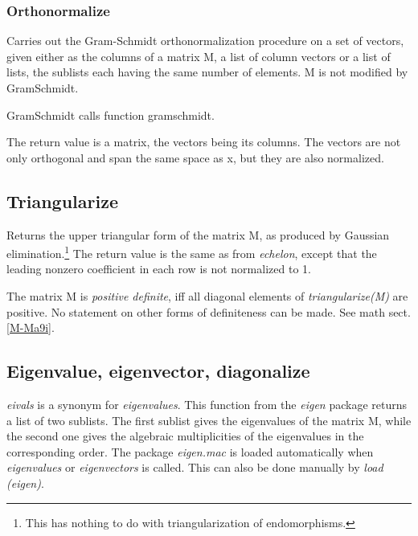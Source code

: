 \documentclass[../Maxima_Workbook.tex]{subfiles}
\begin{document}
\subsubsection{Orthonormalize}

\lz {} \hfill {}

\lz Carries out the Gram-Schmidt orthonormalization procedure on a set of vectors, given either as the columns of a matrix M, a list of column vectors or a list of lists, the sublists each having the same number of elements. M is not modified by GramSchmidt.

\lz GramSchmidt calls function gramschmidt.

\lz The return value is a matrix, the vectors being its columns. The vectors are not only orthogonal and span the same space as x, but they are also normalized.

\subsection{Triangularize}\label{LA11}

\lz {} \hfill \tcr{[function]}

\lz Returns the upper triangular form of the matrix M, as produced by Gaussian elimination.\footnote{This has nothing to do with triangularization of endomorphisms.} The return value is the same as from \emph{echelon}, except that the leading nonzero coefficient in each row is not normalized to 1.

\lz The matrix M is \emph{positive definite}, iff all diagonal elements of \emph{triangularize(M)} are positive. No statement on other forms of definiteness can be made. See math sect. \ref{M-Ma9i}.

\subsection{Eigenvalue, eigenvector, diagonalize}

\lz {} \hfill {}

 \hfill {}

\lz \emph{eivals} is a synonym for \emph{eigenvalues}. This function from the \emph{eigen} package returns a list of two sublists. The first sublist gives the eigenvalues of the matrix M, while the second one gives the algebraic multiplicities of the eigenvalues in the corresponding order. The package \emph{eigen.mac} is loaded automatically when \emph{eigenvalues} or \emph{eigenvectors} is called. This can also be done manually by \emph{load (eigen)}.
\end{document}
